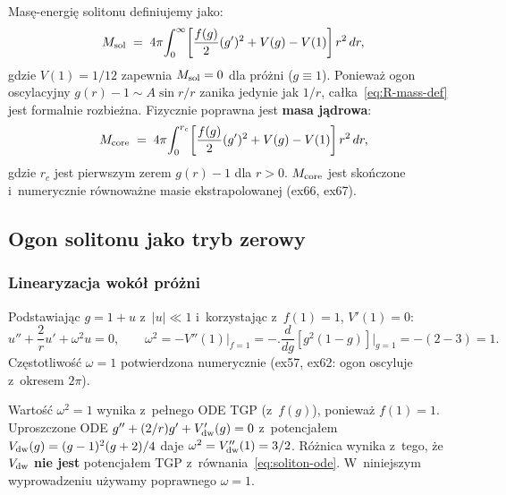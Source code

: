 \begin{definition}\label{def:R-mass}
Mas\k{e}-energi\k{e} solitonu definiujemy jako:
\begin{equation}\label{eq:R-mass-def}
  M_{\rm sol}
  \;=\; 4\pi\!\int_0^\infty\!\left[
    \frac{f(g)}{2}(g')^2 + V(g) - V(1)
  \right]r^2\,dr,
\end{equation}
gdzie $V(1) = 1/12$ zapewnia $M_{\rm sol} = 0$ dla pr\'o\.zni ($g \equiv 1$).
Poniewa\.z ogon oscylacyjny $g(r) - 1 \sim A\sin r/r$ zanika
jedynie jak $1/r$, ca\l{}ka~\eqref{eq:R-mass-def} jest formalnie
rozbie\.zna. Fizycznie poprawna jest \textbf{masa j\k{a}drowa}:
\begin{equation}\label{eq:R-mass-core}
  M_{\rm core}
  \;=\; 4\pi\!\int_0^{r_c}\!\left[
    \frac{f(g)}{2}(g')^2 + V(g) - V(1)
  \right]r^2\,dr,
\end{equation}
gdzie $r_c$ jest pierwszym zerem $g(r) - 1$ dla $r > 0$.
$M_{\rm core}$ jest sko\'nczone i~numerycznie r\'ownowa\.zne
masie ekstrapolowanej (ex66, ex67).
\end{definition}

\subsection{Ogon solitonu jako tryb zerowy}

\subsubsection{Linearyzacja wok\'o\l{} pr\'o\.zni}

Podstawiaj\k{a}c $g = 1 + u$ z~$|u| \ll 1$
i~korzystaj\k{a}c z~$f(1) = 1$, $V'(1) = 0$:
\begin{equation}\label{eq:R-linearized}
  u'' + \frac{2}{r}u' + \omega^2 u = 0,
  \qquad
  \omega^2 = -V''(1)\big|_{f=1}
  = -\bigl.\frac{d}{dg}[g^2(1-g)]\bigr|_{g=1}
  = -(2-3) = 1.
\end{equation}
Cz\k{e}stotliwo\'s\'c $\omega = 1$ potwierdzona numerycznie
(ex57, ex62: ogon oscyluje z~okresem $2\pi$).

\begin{remark}%
\label{rem:R-omega}
Warto\'s\'c $\omega^2 = 1$ wynika z~pe\l{}nego ODE TGP
(z~$f(g)$), poniewa\.z $f(1) = 1$. Uproszczone ODE
$g'' + (2/r)g' + V'_{\rm dw}(g) = 0$ z~potencja\l{}em
$V_{\rm dw}(g) = (g-1)^2(g+2)/4$ daje $\omega^2 = V_{\rm dw}''(1) = 3/2$.
R\'o\.znica wynika z~tego, \.ze $V_{\rm dw}$ \textbf{nie jest}
potencja\l{}em TGP z~r\'ownania~\eqref{eq:soliton-ode}.
W~niniejszym wyprowadzeniu u\.zywamy poprawnego $\omega = 1$.
\end{remark}

